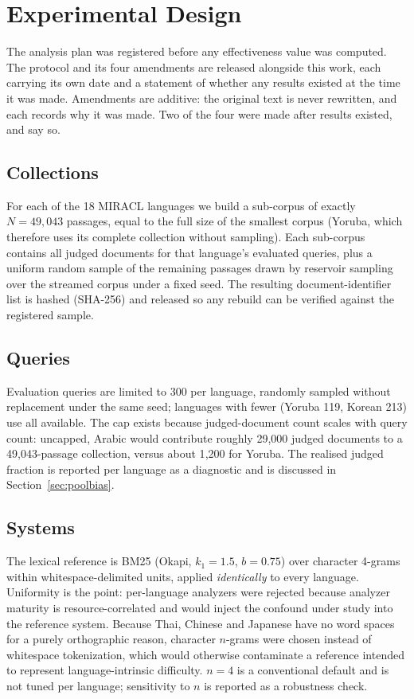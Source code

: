 \documentclass{ijimai_article}
\begin{document}
\section{Experimental Design}

The analysis plan was registered before any effectiveness value was computed. The
protocol and its four amendments are released alongside this work, each carrying its
own date and a statement of whether any results existed at the time it was made.
Amendments are additive: the original text is never rewritten, and each records why
it was made. Two of the four were made after results existed, and say so.

\subsection{Collections}
For each of the 18 MIRACL languages we build a sub-corpus of exactly
$N = 49{,}043$ passages, equal to the full size of the smallest corpus (Yoruba, which
therefore uses its complete collection without sampling). Each sub-corpus contains
all judged documents for that language's evaluated queries, plus a uniform random
sample of the remaining passages drawn by reservoir sampling over the streamed
corpus under a fixed seed. The resulting document-identifier list is hashed
(SHA-256) and released so any rebuild can be verified against the registered
sample.

\subsection{Queries}
Evaluation queries are limited to 300 per language, randomly sampled without
replacement under the same seed; languages with fewer (Yoruba 119, Korean 213) use
all available. The cap exists because judged-document count scales with query count:
uncapped, Arabic would contribute roughly 29{,}000 judged documents to a
49{,}043-passage collection, versus about 1{,}200 for Yoruba. The realised judged
fraction is reported per language as a diagnostic and is discussed in
Section~\ref{sec:poolbias}.

\subsection{Systems}
The lexical reference is BM25 (Okapi, $k_1{=}1.5$, $b{=}0.75$) over character
4-grams within whitespace-delimited units, applied \emph{identically} to every
language. Uniformity is the point: per-language analyzers were rejected because
analyzer maturity is resource-correlated and would inject the confound under study
into the reference system. Because Thai, Chinese and Japanese have no word spaces
for a purely orthographic reason, character $n$-grams were chosen instead of
whitespace tokenization, which would otherwise contaminate a reference intended to
represent language-intrinsic difficulty. $n{=}4$ is a conventional default and is
not tuned per language; sensitivity to $n$ is reported as a robustness check.
\end{document}
